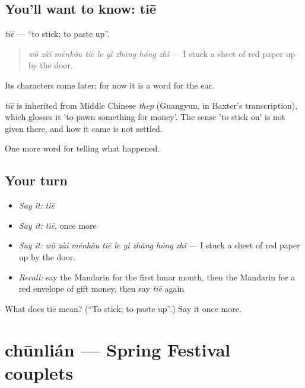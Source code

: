 \subsection*{You'll want to know: tiē}
\emph{tiē} — \textquotedblleft{}to stick; to paste up\textquotedblright{}.

\begin{quote}
\emph{wǒ zài ménkǒu tiē le yì zhāng hóng zhǐ} — I stuck a sheet of red paper up by the door.
\end{quote}

Its characters come later; for now it is a word for the ear.

\begin{cousinweb}
\emph{tiē} is inherited from Middle Chinese \emph{thep} (Guangyun, in Baxter's transcription), which glosses it 'to pawn something for money'. The sense 'to stick on' is not given there, and how it came is not settled.
\end{cousinweb}

\begin{grammarlens}[title={What you've built}]
One more word for telling what happened.
\end{grammarlens}

\subsection*{Your turn}
\begin{itemize}
\raggedright
  \item \emph{Say it:} \emph{tiē}
  \item \emph{Say it:} \emph{tiē}, once more
  \item \emph{Say it:} \emph{wǒ zài ménkǒu tiē le yì zhāng hóng zhǐ} — I stuck a sheet of red paper up by the door.
  \item \emph{Recall:} say the Mandarin for the first lunar month, then the Mandarin for a red envelope of gift money, then say \emph{tiē} again
\end{itemize}

\begin{tcolorbox}[breakable,colback=teal!4,colframe=teal!35!black,title={Before you move on}]
What does tiē mean? (\textquotedblleft{}To stick; to paste up\textquotedblright{}.) Say it once more.
\end{tcolorbox}
\section[chūnlián]{chūnlián — Spring Festival couplets}

